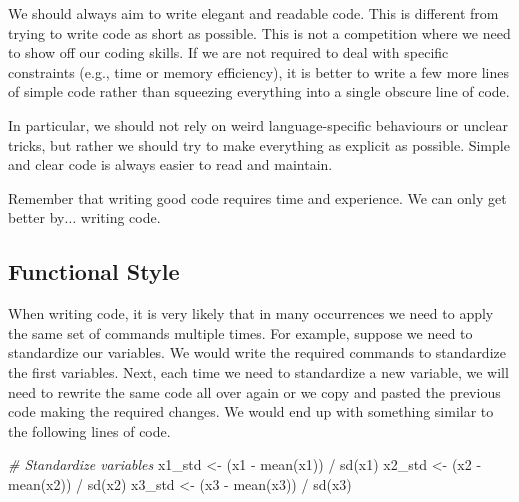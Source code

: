\documentclass[
  11pt,
]{book}
\newenvironment{Shaded}{\begin{snugshade}}{\end{snugshade}}
\newcommand{\CommentTok}[1]{\textcolor[rgb]{0.56,0.35,0.01}{\textit{#1}}}
\newcommand{\FunctionTok}[1]{\textcolor[rgb]{0.00,0.00,0.00}{#1}}
\newcommand{\NormalTok}[1]{#1}
\newcommand{\OtherTok}[1]{\textcolor[rgb]{0.56,0.35,0.01}{#1}}
\newcommand{\SpecialCharTok}[1]{\textcolor[rgb]{0.00,0.00,0.00}{#1}}
\newenvironment{code-tex-bad}
  {\begingroup\definecolor{shadecolor}{RGB}{255, 189, 185}}
  {\endgroup}
\begin{document}
\begin{itemize}
  We should always aim to write elegant and readable code. This is different from trying to write code as short as possible. This is not a competition where we need to show off our coding skills. If we are not required to deal with specific constraints (e.g., time or memory efficiency), it is better to write a few more lines of simple code rather than squeezing everything into a single obscure line of code.

  In particular, we should not rely on weird language-specific behaviours or unclear tricks, but rather we should try to make everything as explicit as possible. Simple and clear code is always easier to read and maintain.
\end{itemize}

Remember that writing good code requires time and experience. We can only get better by\(\ldots\) writing code.

\hypertarget{functional-style}{%
\subsection{Functional Style}\label{functional-style}}

When writing code, it is very likely that in many occurrences we need to apply the same set of commands multiple times. For example, suppose we need to standardize our variables. We would write the required commands to standardize the first variables. Next, each time we need to standardize a new variable, we will need to rewrite the same code all over again or we copy and pasted the previous code making the required changes. We would end up with something similar to the following lines of code.

\begin{code-tex-bad}

\begin{Shaded}
\begin{Highlighting}[]
\CommentTok{\# Standardize variables}
\NormalTok{x1\_std }\OtherTok{\textless{}{-}}\NormalTok{ (x1 }\SpecialCharTok{{-}} \FunctionTok{mean}\NormalTok{(x1)) }\SpecialCharTok{/} \FunctionTok{sd}\NormalTok{(x1)}
\NormalTok{x2\_std }\OtherTok{\textless{}{-}}\NormalTok{ (x2 }\SpecialCharTok{{-}} \FunctionTok{mean}\NormalTok{(x2)) }\SpecialCharTok{/} \FunctionTok{sd}\NormalTok{(x2)}
\NormalTok{x3\_std }\OtherTok{\textless{}{-}}\NormalTok{ (x3 }\SpecialCharTok{{-}} \FunctionTok{mean}\NormalTok{(x3)) }\SpecialCharTok{/} \FunctionTok{sd}\NormalTok{(x3)}
\end{Highlighting}
\end{Shaded}

\end{code-tex-bad}
\end{document}
